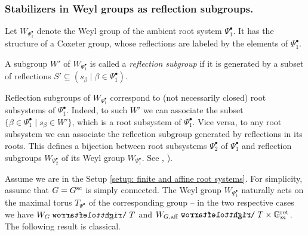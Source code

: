 \subsubsection{Stabilizers in Weyl groups as reflection subgroups.}\label{section: stabilizers in weyl groups as reflection subgroups}
Let $W_{\Psi^{\bullet}_1}$ denote the Weyl group of the ambient root system $\Psi^{\bullet}_1$. It has the structure of a Coxeter group, whose reflections are labeled by the elements of $\Psi^{\bullet}_1$.
\begin{notation}
A subgroup $W'$ of $W_{\Psi^{\bullet}_1}$ is called a \emph{reflection subgroup} if it is generated by a subset of reflections $S' \subseteq (s_{\beta} \mid \beta \in \Psi^{\bullet}_1)$.    
\end{notation}


\begin{remark}
Reflection subgroups of $W_{\Psi^{\bullet}_1}$ correspond to (not necessarily closed) root subsystems of ${\Psi^{\bullet}_1}$. Indeed, to such $W'$ we can associate the subset $\{\beta \in \Psi^{\bullet}_1 \mid s_{\beta} \in W'\}$, which is a root subsystem of $\Psi^{\bullet}_1$. Vice versa, to any root subsystem we can associate the reflection subgroup generated by reflections in its roots. This defines a bijection between root subsystems $\Psi^{\bullet}_2$ of $\Psi^{\bullet}_1$ and reflection subgroups $W_{\Psi^{\bullet}_2}$ of its Weyl group $W_{\Psi^{\bullet}_1}$. See \cite[\S 1.2]{DL11a}, \cite[\S 2]{FRT08}). 
\end{remark}

Assume we are in the Setup \ref{setup: finite and affine root systems}.
For simplicity, assume that $G=G^{\sc}$ is simply connected.
The Weyl group $W_{\Psi^{\bullet}_1}$ naturally acts on the maximal torus $T_{\Psi^{\bullet}}$ of the corresponding group -- in the two respective cases we have $W_G \acts T$ and $W_{G, \aff} \acts T \times \Gm^{\rot}$. The following result is classical.

